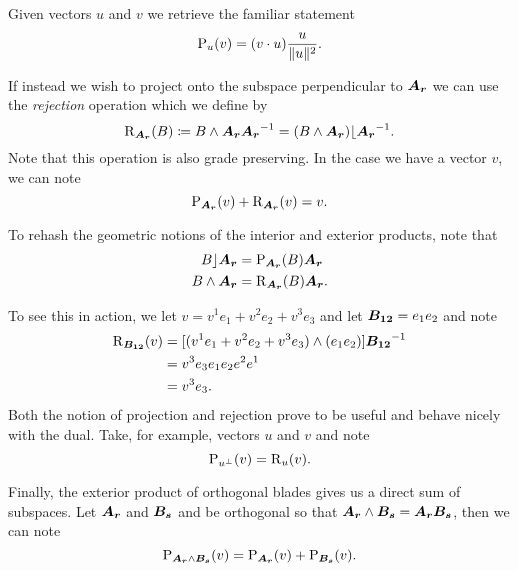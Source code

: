 Given vectors $u$ and $v$ we retrieve the familiar statement 
\[
\operatorname{P}_u (v) = (v \cdot u) \frac{u}{\|u\|^2}.
\]

If instead we wish to project onto the subspace perpendicular to $\boldsymbol{A_r}$ we can use the \emph{rejection} operation which we define by
\begin{equation}
\label{eq:rejection}
\operatorname{R}_{\boldsymbol{A_r}}(B) \coloneqq B \wedge \boldsymbol{A_r} \boldsymbol{A_r}^{-1} = (B\wedge \boldsymbol{A_r})\lfloor \boldsymbol{A_r}^{-1}.
\end{equation}
Note that this operation is also grade preserving. In the case we have a vector $v$, we can note
\begin{equation}
\label{eq:projection+rejection_vector}
\operatorname{P}_{\boldsymbol{A_r}}(v) + \operatorname{R}_{\boldsymbol{A_r}}(v) = v.
\end{equation}

To rehash the geometric notions of the interior and exterior products, note that
\begin{align}
    B \rfloor \boldsymbol{A_r} &= \operatorname{P}_{\boldsymbol{A_r}} (B) \boldsymbol{A_r}\\
    B \wedge \boldsymbol{A_r} &= \operatorname{R}_{\boldsymbol{A_r}}(B) \boldsymbol{A_r}.
\end{align}

To see this in action, we let $v=v^1 e_1 + v^2 e_2 + v^3 e_3$ and let $\boldsymbol{B_{12}}=e_1 e_2$ and note
\begin{align*}
    \operatorname{R}_{\boldsymbol{B_{12}}}(v) &= [(v^1 e_1 + v^2 e_2 + v^3 e_3)\wedge (e_1 e_2)]\boldsymbol{B_{12}}^{-1}\\
    &= v^3 e_3 e_1 e_2 e^2 e^1 \\
    &= v^3 e_3.
\end{align*}
Both the notion of projection and rejection prove to be useful and behave nicely with the dual. Take, for example, vectors $u$ and $v$ and note
\begin{equation}
\label{eq:projection_rejection_vector}
\operatorname{P}_{u^\perp}(v) = \operatorname{R}_u(v).
\end{equation}

Finally, the exterior product of orthogonal blades gives us a direct sum of subspaces. Let $\boldsymbol{A_r}$ and $\boldsymbol{B_s}$ and be orthogonal so that $\boldsymbol{A_r}\wedge \boldsymbol{B_s}=\boldsymbol{A_r}\boldsymbol{B_s}$, then we can note
\begin{equation}
    \operatorname{P}_{\boldsymbol{A_r}\wedge \boldsymbol{B_s}} (v) = \operatorname{P}_{\boldsymbol{A_r}}(v) + \operatorname{P}_{\boldsymbol{B_s}}(v).
\end{equation}



